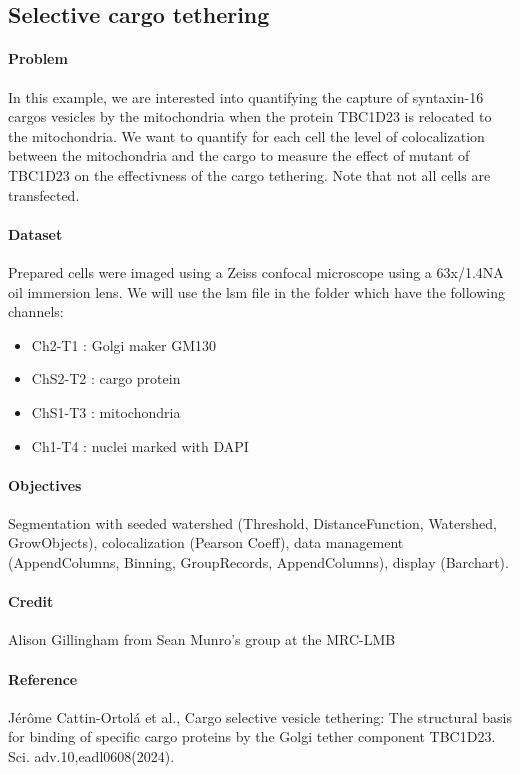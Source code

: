 \subsection{Selective cargo tethering}

\paragraph{Problem}

In this example, we are interested into quantifying the capture of syntaxin-16 cargos vesicles by the mitochondria when the protein TBC1D23 is relocated to the mitochondria. We want to quantify for each cell the level of colocalization between the mitochondria and the cargo to measure the effect of mutant of TBC1D23 on the effectivness of the cargo tethering. Note that not all cells are transfected.


\paragraph{Dataset} Prepared cells were imaged using a Zeiss confocal microscope using a 63x/1.4NA oil immersion lens. We will use the lsm file in the folder  which have the following channels:

\begin{itemize}\itemsep0em
    \item Ch2-T1 : Golgi maker GM130
    \item ChS2-T2 : cargo protein
    \item ChS1-T3 : mitochondria
    \item Ch1-T4 : nuclei marked with DAPI
\end{itemize}

\paragraph{Objectives} Segmentation with seeded watershed (Threshold, DistanceFunction, Watershed, GrowObjects), colocalization (Pearson Coeff), data management (AppendColumns, Binning, GroupRecords, AppendColumns), display (Barchart).

\paragraph{Credit}  Alison Gillingham from Sean Munro's group at the MRC-LMB

\paragraph{Reference} Jérôme Cattin-Ortolá et al., Cargo selective vesicle tethering: The structural basis for binding of specific cargo proteins by the Golgi tether component TBC1D23. Sci. adv.10,eadl0608(2024). 

